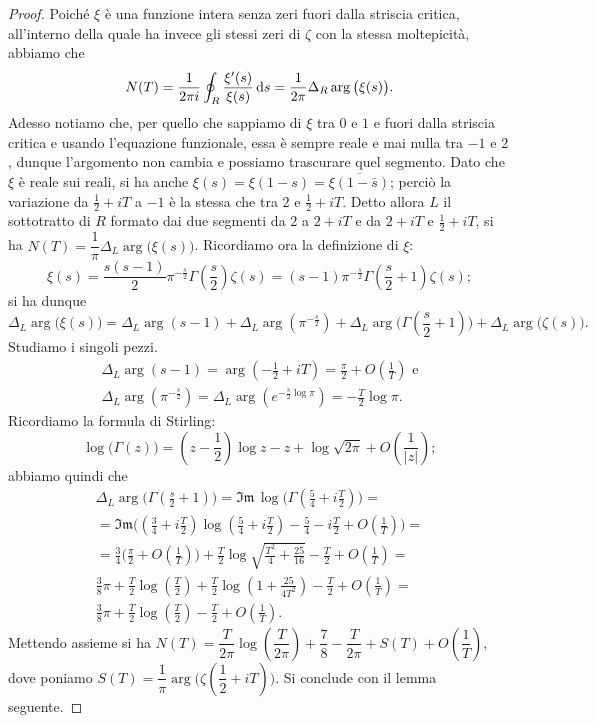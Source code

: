\begin{proof}
  Poiché $\xi$ è una funzione intera senza zeri fuori dalla striscia critica, all'interno della quale ha invece gli stessi zeri di $\zeta$ con la stessa moltepicità, abbiamo che
  $$N(T)=\frac{1}{2\pi i} \oint_R \frac{\xi'(s)}{\xi(s)}\mathop{}\!\mathrm{d} s=\frac{1}{2\pi}\Delta_R \arg\big(\xi(s)\big).$$
  Adesso notiamo che, per quello che sappiamo di $\xi$ tra $0$ e $1$ e fuori dalla striscia critica e usando l'equazione funzionale, essa è sempre reale e mai nulla tra $-1$ e $2$, dunque l'argomento non cambia e possiamo trascurare quel segmento. Dato che $\xi$ è reale sui reali, si ha anche $\xi(s)=\xi(1-s)=\overline{\xi(1-\bar{s})}$; perciò la variazione da $\frac{1}{2}+iT$ a $-1$ è la stessa che tra $2$ e $\frac{1}{2}+iT$.
  Detto allora $L$ il sottotratto di $R$ formato dai due segmenti da $2$ a $2+iT$ e da $2+iT$ e $\frac{1}{2}+iT$, si ha $N(T)=\dfrac{1}{\pi}\Delta_L \arg\big(\xi(s)\big)$. Ricordiamo ora la definizione di $\xi$:
  $$\xi(s)=\frac{s(s-1)}{2}\pi^{-\frac{s}{2}}\Gamma\left(\frac{s}{2}\right)\zeta(s)=(s-1)\pi^{-\frac{s}{2}}\Gamma\left(\frac{s}{2}+1\right)\zeta(s);$$
  si ha dunque
  $$\Delta_L\arg\big(\xi(s)\big)=\Delta_L\arg(s-1)+\Delta_L\arg\left(\pi^{-\frac{s}{2}}\right)+\Delta_L\arg\Bigg(\Gamma\left(\frac{s}{2}+1\right)\Bigg)+\Delta_L\arg\big(\zeta(s)\big).$$
  Studiamo i singoli pezzi.
  \begin{gather*}
    \Delta_L\arg(s-1)=\arg\left(-\frac{1}{2}+iT\right)=\frac{\pi}{2}+O\left(\frac{1}{T}\right) \text{ e}\\
    \Delta_L\arg\left(\pi^{-\frac{s}{2}}\right)=\Delta_L\arg\left(e^{-\frac{s}{2}\log{\pi}}\right)=-\frac{T}{2}\log{\pi}.
  \end{gather*}
  Ricordiamo la formula di Stirling:
  $$\log\big(\Gamma(z)\big)=\left(z-\frac{1}{2}\right)\log{z}-z+\log{\sqrt{2\pi}}+O\left(\frac{1}{|z|}\right);$$
  abbiamo quindi che
  \begin{gather*}
    \Delta_L\arg\Bigg(\Gamma\left(\frac{s}{2}+1\right)\Bigg)=\mathfrak{Im}\,\log\Bigg(\Gamma\left(\frac{5}{4}+i\frac{T}{2}\right)\Bigg)= \\
    =\mathfrak{Im}\Bigg(\left(\frac{3}{4}+i\frac{T}{2}\right)\log\left(\frac{5}{4}+i\frac{T}{2}\right)-\frac{5}{4}-i\frac{T}{2}+O\left(\frac{1}{T}\right)\Bigg)= \\
    =\frac{3}{4}\Bigg(\frac{\pi}{2}+O\left(\frac{1}{T}\right)\Bigg)+\frac{T}{2}\log\sqrt{\frac{T^2}{4}+\frac{25}{16}}-\frac{T}{2}+O\left(\frac{1}{T}\right)=\\
    \frac{3}{8}\pi+\frac{T}{2}\log\left(\frac{T}{2}\right)+\frac{T}{2}\log\left(1+\frac{25}{4T^2}\right)-\frac{T}{2}+O\left(\frac{1}{T}\right)=\\
    \frac{3}{8}\pi+\frac{T}{2}\log\left(\frac{T}{2}\right)-\frac{T}{2}+O\left(\frac{1}{T}\right).
  \end{gather*}
  Mettendo assieme si ha $N(T)=\dfrac{T}{2\pi}\log\left(\dfrac{T}{2\pi}\right)+\dfrac{7}{8}-\dfrac{T}{2\pi}+S(T)+O\left(\dfrac{1}{T}\right)$, dove poniamo $S(T)=\dfrac{1}{\pi}\arg\Bigg(\zeta\left(\dfrac{1}{2}+iT\right)\Bigg)$. Si conclude con il lemma seguente.
\end{proof}

